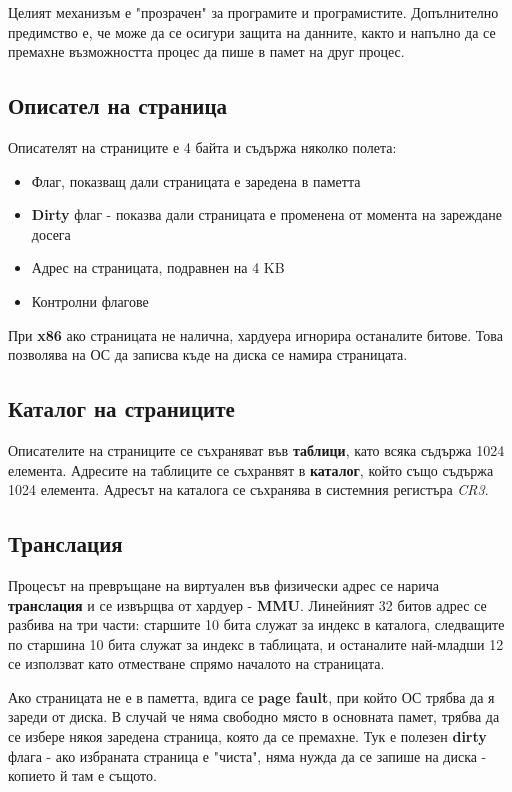 \documentclass[fleqn,12pt]{article}
\begin{document}
Целият механизъм е "прозрачен" за програмите и програмистите. Допълнително предимство е, че може да се осигури защита на данните,
както и напълно да се премахне възможността процес да пише в памет на друг процес.

\subsection{Описател на страница}
Описателят на страниците е 4 байта и съдържа няколко полета:
\begin{itemize}
    \item Флаг, показващ дали страницата е заредена в паметта
    \item \textbf{Dirty} флаг - показва дали страницата е променена от момента на зареждане досега
    \item Адрес на страницата, подравнен на 4 KB
    \item Контролни флагове
\end{itemize}

При \textbf{x86} ако страницата не налична, хардуера игнорира останалите битове. Това позволява на ОС да записва
къде на диска се намира страницата.

\subsection{Каталог на страниците}
Описателите на страниците се съхраняват във \textbf{таблици}, като всяка съдържа 1024 елемента. 
Адресите на таблиците се съхранвят в \textbf{каталог}, който също съдържа 1024 елемента.
Адресът на каталога се съхранява в системния регистъра \textit{CR3}.

\subsection{Транслация}
Процесът на превръщане на виртуален във физически адрес се нарича \textbf{транслация} и се извърщва от хардуер - \textbf{MMU}.
Линейният 32 битов адрес се разбива на три части: старшите 10 бита служат за индекс в каталога, следващите по старшина
10 бита служат за индекс в таблицата, и останалите най-младши 12 се използват като отместване спрямо началото на страницата.

Ако страницата не е в паметта, вдига се \textbf{page fault}, при който ОС трябва да я зареди от диска. В случай че няма свободно място
в основната памет, трябва да се избере някоя заредена страница, която да се премахне. Тук е полезен 
\textbf{dirty} флага - ако избраната страница е "чиста", няма нужда да се запише на диска - копието й там е същото.
\end{document}
